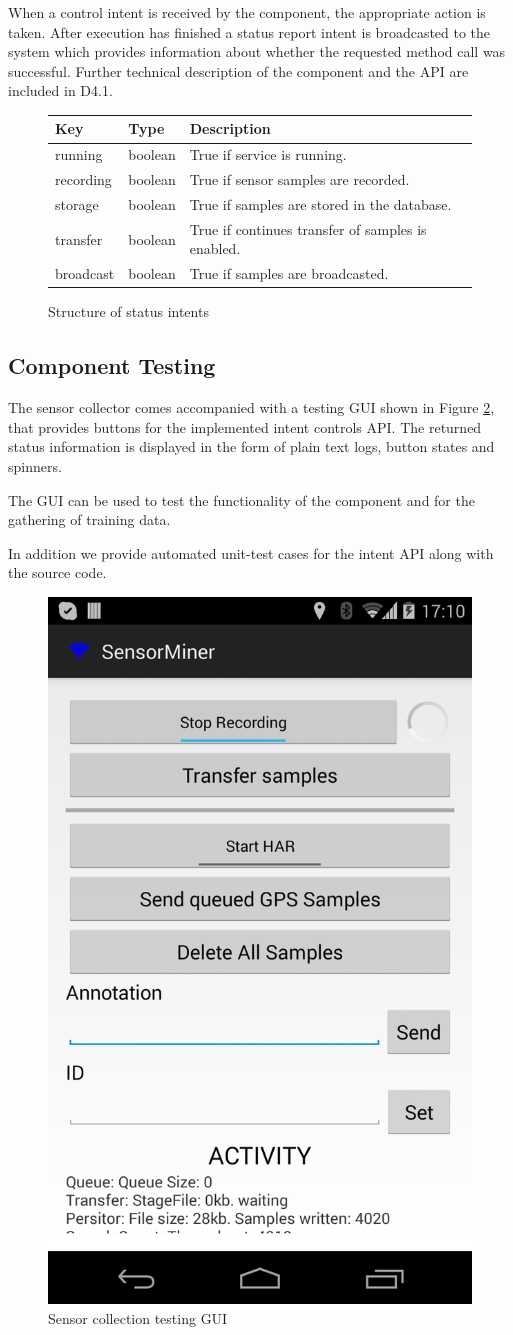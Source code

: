 When a control intent is received by the component, the appropriate
action is taken. After execution has finished a status report intent
is broadcasted to the system which provides information about whether
the requested method call was successful. Further technical
description of the component and the API are included in D4.1.

\begin{figure}[ht]
\centering
\begin{tabular}{|l|l|l|} \hline
   Key       & Type    & Description                                       \\ \hline
   running   & boolean & True if service is running.                       \\
   recording & boolean & True if sensor samples are recorded.              \\
   storage   & boolean & True if samples are stored in the database.       \\
   transfer  & boolean & True if continues transfer of samples is enabled. \\
   broadcast & boolean & True if samples are broadcasted.                  \\ \hline
\end{tabular}
\caption{Structure of status intents}
\label{tab:StatusIntent}
\end{figure}

\subsection*{Component Testing}

The sensor collector comes accompanied with a testing GUI shown in
Figure \ref{fig:sc_gui}, that provides buttons for the implemented
intent controls API. The returned status information is displayed in
the form of plain text logs, button states and spinners.

The GUI can be used to test the functionality of the component and for
the gathering of training data.

In addition we provide automated unit-test cases for the intent API
along with the source code.


\begin{figure}[h]
\centering
\includegraphics[width=0.3 \textwidth]{img/sc/sc_gui.png}
\caption{Sensor collection testing GUI}\label{fig:sc_gui}
\end{figure}

